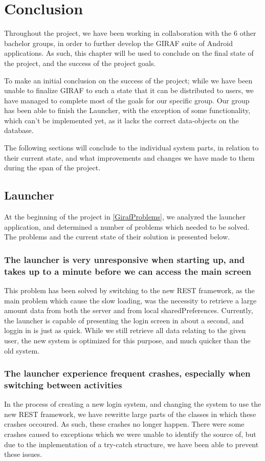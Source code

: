 \chapter{Conclusion}
Throughout the project, we have been working in collaboration with the 6 other
bachelor groups, in order to further develop the GIRAF suite of Android
applications. As such, this chapter will be used to conclude on the final state
of the project, and the success of the project goals.\nl

To make an initial conclusion on the success of the project; while we have been
unable to finalize GIRAF to such a state that it can be distributed to users, we
have managed to complete most of the goals for our specific group. Our group has
been able to finish the Launcher, with the exception of some functionality,
which can't be implemented yet, as it lacks the correct data-objects on the
database.\nl

The following sections will conclude to the individual system parts, in relation
to their current state, and what improvements and changes we have made to them
during the span of the project.

\section{Launcher}
At the beginning of the project in \autoref{GirafProblems}, we analyzed the
launcher application, and determined a number of problems which needed to be
solved. The problems and the current state of their solution is presented
below.

\subsection*{The launcher is very unresponsive when starting up, and takes up to
a minute before we can access the main screen}
 This problem has been solved by
switching to the new REST framework, as the main problem which cause the slow
loading, was the necessity to retrieve a large amount data from both the server
and from local sharedPreferences. Currently, the launcher is capable of
presenting the login screen in about a second, and loggin in is just as quick.
While we still retrieve all data relating to the given user, the new system is
optimized for this purpose, and much quicker than the old system.

\subsection*{The launcher experience frequent crashes, especially when switching between
activities}
In the process of creating a new login system, and changing the
system to use the new REST framework, we have rewritte large parts of the
classes in which these crashes occoured. As such, these crashes no longer
happen. There were some crashes caused to exceptions which we were unable to
identify the source of, but due to the implementation of a try-catch structure,
we have been able to prevent these issues.

